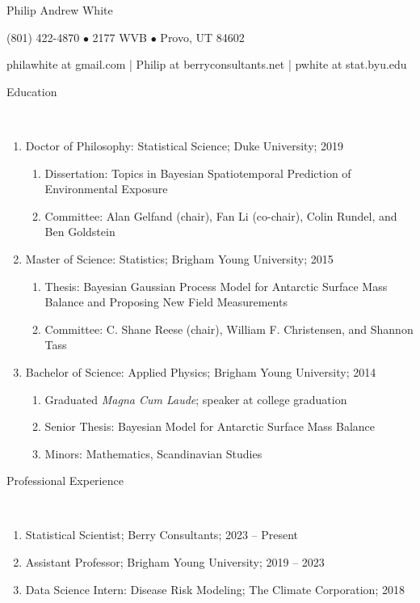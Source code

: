 \documentclass[11pt]{article}
\newcommand{\head}[1]{ %
    \bigskip %
    \begin{large}\begin{bf}{#1}\end{bf}\end{large} %

    \ \\ [-1.3cm] %

    \hrulefill}
\begin{document}

\centerline{ \LARGE Philip Andrew White }
\smallskip
\centerline{ (801) 422-4870 $\bullet$ 2177 WVB $\bullet$ Provo, UT 84602 }
\smallskip
\centerline{philawhite at gmail.com | Philip at berryconsultants.net | pwhite at stat.byu.edu }\smallskip


\head{Education}

\begin{enumerate}[label=$\bullet$]
\item Doctor of Philosophy: Statistical Science; Duke University; 2019
\begin{enumerate}[label=$\cdot$]
\item Dissertation: Topics in Bayesian Spatiotemporal Prediction of Environmental Exposure
\item Committee: Alan Gelfand (chair), Fan Li (co-chair), Colin Rundel, and Ben Goldstein
\end{enumerate}

\item Master of Science: Statistics; Brigham Young University; 2015

\begin{enumerate}[label=$\cdot$]
\item Thesis: Bayesian Gaussian Process Model for Antarctic Surface Mass Balance and Proposing New Field Measurements
\item  Committee: C. Shane Reese (chair), William F. Christensen, and Shannon Tass
\end{enumerate}

\item Bachelor of Science: Applied Physics; Brigham Young University; 2014 

\begin{enumerate}[label=$\cdot$]
\item Graduated \emph{Magna Cum Laude}; speaker at college graduation
\item Senior Thesis: Bayesian Model for Antarctic Surface Mass Balance
\item Minors: Mathematics, Scandinavian Studies
\end{enumerate}
\end{enumerate}


\head{Professional Experience}

\begin{enumerate}[label=$\bullet$]


\item Statistical Scientist; Berry Consultants; 2023 -- Present

\item Assistant Professor; Brigham Young University; 2019 -- 2023

\item Data Science Intern: Disease Risk Modeling; The Climate Corporation; 2018

\end{enumerate}
\end{document}
